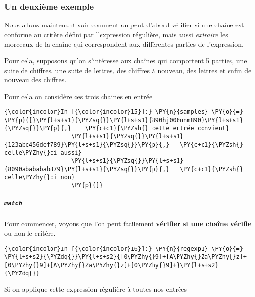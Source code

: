     \hypertarget{un-deuxiuxe8me-exemple}{%
\subsubsection{Un deuxième exemple}\label{un-deuxiuxe8me-exemple}}

    Nous allons maintenant voir comment on peut d'abord vérifier si une
chaîne est conforme au critère défini par l'expression régulière, mais
aussi \emph{extraire} les morceaux de la chaîne qui correspondent aux
différentes parties de l'expression.

Pour cela, supposons qu'on s'intéresse aux chaînes qui comportent 5
parties, une suite de chiffres, une suite de lettres, des chiffres à
nouveau, des lettres et enfin de nouveau des chiffres.

    Pour cela on considère ces trois chaines en entrée

    \begin{Verbatim}[commandchars=\\\{\},frame=single,framerule=0.3mm,rulecolor=\color{cellframecolor}]
{\color{incolor}In [{\color{incolor}15}]:} \PY{n}{samples} \PY{o}{=} \PY{p}{[}\PY{l+s+s1}{\PYZsq{}}\PY{l+s+s1}{890hj000nnm890}\PY{l+s+s1}{\PYZsq{}}\PY{p}{,}    \PY{c+c1}{\PYZsh{} cette entrée convient}
                   \PY{l+s+s1}{\PYZsq{}}\PY{l+s+s1}{123abc456def789}\PY{l+s+s1}{\PYZsq{}}\PY{p}{,}   \PY{c+c1}{\PYZsh{} celle\PYZhy{}ci aussi}
                   \PY{l+s+s1}{\PYZsq{}}\PY{l+s+s1}{8090abababab879}\PY{l+s+s1}{\PYZsq{}}\PY{p}{,}   \PY{c+c1}{\PYZsh{} celle\PYZhy{}ci non}
                   \PY{p}{]}
\end{Verbatim}


    \hypertarget{match}{%
\subparagraph{\texorpdfstring{\texttt{match}}{match}}\label{match}}

    Pour commencer, voyons que l'on peut facilement \textbf{vérifier si une
chaîne vérifie} ou non le critère.

    \begin{Verbatim}[commandchars=\\\{\},frame=single,framerule=0.3mm,rulecolor=\color{cellframecolor}]
{\color{incolor}In [{\color{incolor}16}]:} \PY{n}{regexp1} \PY{o}{=} \PY{l+s+s2}{\PYZdq{}}\PY{l+s+s2}{[0\PYZhy{}9]+[A\PYZhy{}Za\PYZhy{}z]+[0\PYZhy{}9]+[A\PYZhy{}Za\PYZhy{}z]+[0\PYZhy{}9]+}\PY{l+s+s2}{\PYZdq{}}
\end{Verbatim}


    Si on applique cette expression régulière à toutes nos entrées

